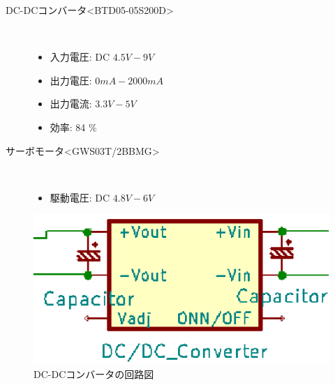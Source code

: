 \begin{description}
    \item[DC-DCコンバータ\textless BTD05-05S200D\textgreater \cite{dcdcconverter}]\mbox{}\\
    \vspace{-5mm}
        \begin{itemize}
            \item 入力電圧: DC $4.5\unit{V}-9\unit{V}$
            \item 出力電圧: $0\unit{mA}-2000\unit{mA}$
            \item 出力電流: $3.3\unit{V}-5\unit{V}$
            \item 効率: 84 \%
        \end{itemize}
     \item[サーボモータ\textless GWS03T/2BBMG\textgreater]\mbox{}\\
    \vspace{-5mm}
         \begin{itemize}
            \item 駆動電圧: DC $4.8\unit{V}-6\unit{V}$
        \end{itemize}
\end{description}


\begin{figure}[h]
\centering
\includegraphics[scale=0.8]{picture/eps/ele_cap.eps}
\caption{DC-DCコンバータの回路図}
\label{fig::ele_cap}
\end{figure}




